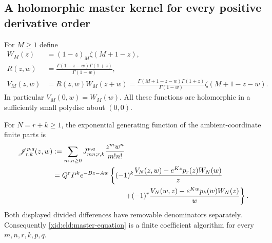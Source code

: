 \subsection{A holomorphic master kernel for every positive derivative order}

For $M\ge1$ define
\begin{align}
 W_M(z)&=(1-z)_M\zeta(M+1-z),\\
 R(z,w)&=\frac{\Gamma(1-z-w)\Gamma(1+z)}{\Gamma(1-w)},\\
 V_M(z,w)&=R(z,w)W_M(z+w)
 =\frac{\Gamma(M+1-z-w)\Gamma(1+z)}{\Gamma(1-w)}
                  \zeta(M+1-z-w).
 \label{xid:cld:VW}
\end{align}
In particular $V_M(0,w)=W_M(w)$.  All these functions are holomorphic
in a sufficiently small polydisc about $(0,0)$.

\begin{theorem}
\label{xid:cld:master}
For $N=r+k\ge1$, the exponential generating function of the
ambient-coordinate finite parts is
\begin{align}
 \mathscr J_{r,k}^{p,q}(z,w)
 &: =\sum_{m,n\ge0}J_{mn;r,k}^{p,q}\frac{z^mw^n}{m!n!}\notag\\
 &=Q^rP^k e^{-Bz-Aw}\left\{
 (-1)^k\frac{V_N(z,w)-e^{Kz}p_r(z)W_N(w)}{z}\right.\notag\\
 &\hspace{35mm}\left.
 +(-1)^r\frac{V_N(w,z)-e^{Kw}p_k(w)W_N(z)}{w}
                                      \right\}.
 \label{xid:cld:master-equation}
\end{align}
Both displayed divided differences have removable denominators separately.
Consequently \eqref{xid:cld:master-equation} is a finite coefficient algorithm
for every $m,n,r,k,p,q$.
\end{theorem}

